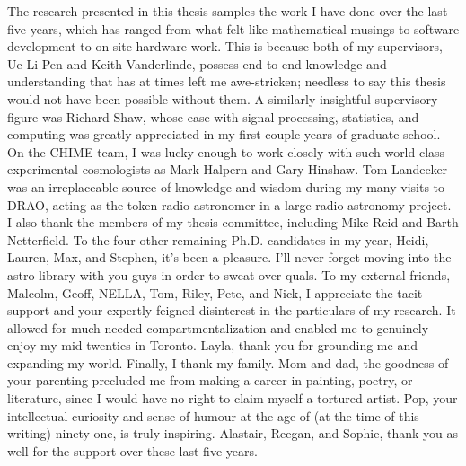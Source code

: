 \documentclass[12pt]{ut-thesis}
\begin{document}
\begin{preliminary}
\begin{acknowledgements}
   The research presented in this thesis samples the work 
   I have done over the last five years, which has 
   ranged from what felt like mathematical musings to software development  
   to on-site hardware work. This is because both of my supervisors, 
   Ue-Li Pen and Keith Vanderlinde, possess end-to-end knowledge 
   and understanding that has at times left me awe-stricken; 
   needless to say this thesis would not have been possible without them. 
   A similarly insightful supervisory figure was Richard Shaw, 
   whose ease with signal processing, statistics, and computing 
   was greatly appreciated in my first couple years of graduate school. 
   On the CHIME team, I was lucky enough to work closely 
   with such world-class experimental cosmologists as Mark Halpern 
   and Gary Hinshaw. Tom Landecker was an irreplaceable source 
   of knowledge and wisdom during my many 
   visits to DRAO, acting as the token radio astronomer in a 
   large radio astronomy project. I also thank the members of my 
   thesis committee, including Mike Reid and Barth Netterfield. 
   To the four other remaining Ph.D. candidates in my year,
   Heidi, Lauren, Max, and Stephen, it's been a pleasure. I'll 
   never forget moving into the astro library with you guys 
   in order to sweat over quals. To my external friends, Malcolm,
   Geoff, NELLA, Tom, Riley, Pete, and Nick, I appreciate the tacit 
   support and your expertly feigned disinterest in the particulars 
   of my research. It allowed for much-needed compartmentalization 
   and enabled me to genuinely enjoy my mid-twenties in Toronto. 
   Layla, thank you for grounding me and expanding my world.
   Finally, I thank my family. Mom and dad, the goodness of your 
   parenting precluded me from 
   making a career in painting, poetry, or literature, since I 
   would have no right to claim myself a tortured artist. Pop, 
   your intellectual curiosity and sense of humour 
   at the age of (at the time of this writing) ninety one, 
   is truly inspiring. Alastair, Reegan, and Sophie, thank you 
   as well for the support over these last five years.

\end{acknowledgements}



\end{preliminary}
\end{document}
